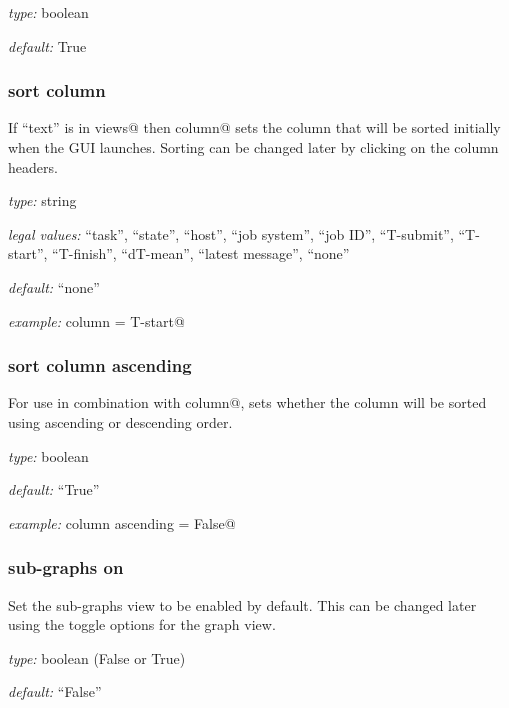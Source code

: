\begin{myitemize}
\item {\em type:} boolean
\item {\em default:} True
\end{myitemize}


\subsubsection{sort column}

If ``text'' is in \lstinline@initial views@ then \lstinline@sort column@ sets
the column that will be sorted initially when the GUI launches. Sorting can be
changed later by clicking on the column headers.

\begin{myitemize}
    \item {\em type:} string
    \item {\em legal values:} ``task'', ``state'', ``host'', ``job system'',
        ``job ID'', ``T-submit'', ``T-start'', ``T-finish'', ``dT-mean'',
        ``latest message'', ``none''
    \item {\em default:} ``none''
    \item {\em example:} \lstinline@sort column = T-start@
\end{myitemize}


\subsubsection{sort column ascending}

For use in combination with \lstinline@sort column@, sets whether the column will
be sorted using ascending or descending order.

\begin{myitemize}
    \item {\em type:} boolean
    \item {\em default:} ``True''
    \item {\em example:} \lstinline@sort column ascending = False@
\end{myitemize}

\subsubsection{sub-graphs on}

Set the sub-graphs view to be enabled by default.
This can be changed later using the toggle options for the graph view.

\begin{myitemize}
\item {\em type:} boolean (False or True)
\item {\em default:} ``False''
\end{myitemize}


